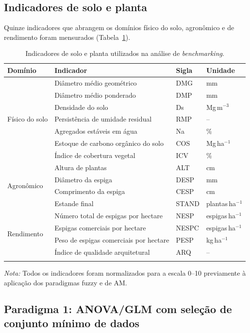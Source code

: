 \documentclass[pdflatex,sn-basic]{sn-jnl}%
\begin{document}
\subsection{Indicadores de solo e planta}\label{subsec:indicators}

Quinze indicadores que abrangem os domínios físico do solo, agronômico e de rendimento foram mensurados (Tabela~\ref{tab:indicators}).

\begin{table}[h]
\caption{Indicadores de solo e planta utilizados na análise de \textit{benchmarking}.}\label{tab:indicators}
\begin{tabular*}{\textwidth}{@{\extracolsep\fill}llll}
\toprule
Domínio & Indicador & Sigla & Unidade \\
\midrule
\multirow{7}{*}{Físico do solo} 
  & Diâmetro médio geométrico & DMG & mm \\
  & Diâmetro médio ponderado & DMP & mm \\
  & Densidade do solo & Ds & Mg\,m$^{-3}$ \\
  & Persistência de umidade residual & RMP & -- \\
  & Agregados estáveis em água & Na & \% \\
  & Estoque de carbono orgânico do solo & COS & Mg\,ha$^{-1}$ \\
  & Índice de cobertura vegetal & ICV & \% \\
\midrule
\multirow{4}{*}{Agronômico} 
  & Altura de plantas & ALT & cm \\
  & Diâmetro da espiga & DESP & mm \\
  & Comprimento da espiga & CESP & cm \\
  & Estande final & STAND & plantas\,ha$^{-1}$ \\
\midrule
\multirow{4}{*}{Rendimento} 
  & Número total de espigas por hectare & NESP & espigas\,ha$^{-1}$ \\
  & Espigas comerciais por hectare & NESPC & espigas\,ha$^{-1}$ \\
  & Peso de espigas comerciais por hectare & PESP & kg\,ha$^{-1}$ \\
  & Índice de qualidade arquitetural & ARQ & -- \\
\botrule
\end{tabular*}
\smallskip\noindent\textit{Nota:} Todos os indicadores foram normalizados para a escala 0--10 previamente à aplicação dos paradigmas fuzzy e de AM.
\end{table}

\subsection{Paradigma 1: ANOVA/GLM com seleção de conjunto mínimo de dados}\label{subsec:anova}
\end{document}

